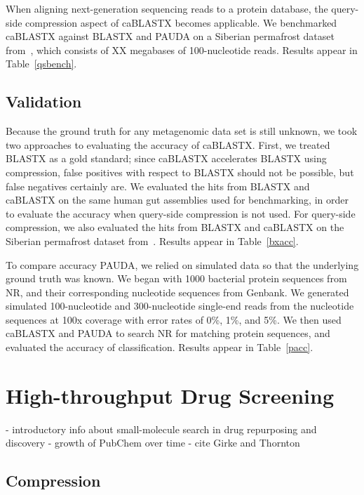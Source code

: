 \documentclass{amsbook}
\theoremstyle{definition}
\theoremstyle{remark}
\numberwithin{equation}{section}
\begin{document}
When aligning next-generation sequencing reads to a protein database, the
query-side compression aspect of caBLASTX becomes applicable.
We benchmarked caBLASTX against BLASTX and PAUDA on a Siberian
permafrost dataset from~\cite{blah}, which consists of XX megabases of
100-nucleotide reads.
Results appear in Table~\ref{qsbench}.



\subsection*{Validation}

Because the ground truth for any metagenomic data set is still unknown,
we took two approaches to evaluating the accuracy of caBLASTX.
First, we treated BLASTX as a gold standard; since caBLASTX accelerates BLASTX
using compression, false positives with respect to BLASTX should not be
possible, but false negatives certainly are.
We evaluated the hits from BLASTX and caBLASTX on the same human gut
assemblies used for benchmarking, in order to evaluate the accuracy when
query-side compression is not used.
For query-side compression, we also evaluated the hits from BLASTX and caBLASTX
on the Siberian permafrost dataset from~\cite{blah}.
Results appear in Table~\ref{bxacc}.

To compare accuracy PAUDA, we relied on simulated data so that the
underlying ground truth was known.
We began with 1000 bacterial protein sequences from NR, and their corresponding
nucleotide sequences from Genbank.
We generated simulated 100-nucleotide and 300-nucleotide single-end reads from
the nucleotide sequences at 100x coverage with error rates of 0\%, 1\%, and 5\%.
We then used caBLASTX and PAUDA to search NR for matching protein sequences,
and evaluated the accuracy of classification.
Results appear in Table~\ref{pacc}.

\section*{High-throughput Drug Screening}

- introductory info about small-molecule search in drug repurposing and discovery
- growth of PubChem over time
- cite Girke and Thornton

\subsection*{Compression}
\end{document}
